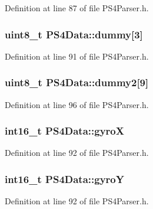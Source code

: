 \-Definition at line 87 of file \-P\-S4\-Parser.\-h.

\hypertarget{struct_p_s4_data_aef57cffc87f423db996d817ea75fe5f9}{
\subsubsection[{dummy}]{\setlength{\rightskip}{0pt plus 5cm}uint8\-\_\-t {\bf \-P\-S4\-Data\-::dummy}\mbox{[}3\mbox{]}}}\label{struct_p_s4_data_aef57cffc87f423db996d817ea75fe5f9}


\-Definition at line 91 of file \-P\-S4\-Parser.\-h.

\hypertarget{struct_p_s4_data_ae084b9b30d75bf86aa29b7c537297e55}{
\subsubsection[{dummy2}]{\setlength{\rightskip}{0pt plus 5cm}uint8\-\_\-t {\bf \-P\-S4\-Data\-::dummy2}\mbox{[}9\mbox{]}}}\label{struct_p_s4_data_ae084b9b30d75bf86aa29b7c537297e55}


\-Definition at line 96 of file \-P\-S4\-Parser.\-h.

\hypertarget{struct_p_s4_data_a0535a4a38dc250250fbf253e6bea53dc}{
\subsubsection[{gyro\-X}]{\setlength{\rightskip}{0pt plus 5cm}int16\-\_\-t {\bf \-P\-S4\-Data\-::gyro\-X}}}\label{struct_p_s4_data_a0535a4a38dc250250fbf253e6bea53dc}


\-Definition at line 92 of file \-P\-S4\-Parser.\-h.

\hypertarget{struct_p_s4_data_a2c7c9d0313863ab69e7cafdd79b7492c}{
\subsubsection[{gyro\-Y}]{\setlength{\rightskip}{0pt plus 5cm}int16\-\_\-t {\bf \-P\-S4\-Data\-::gyro\-Y}}}\label{struct_p_s4_data_a2c7c9d0313863ab69e7cafdd79b7492c}


\-Definition at line 92 of file \-P\-S4\-Parser.\-h.

